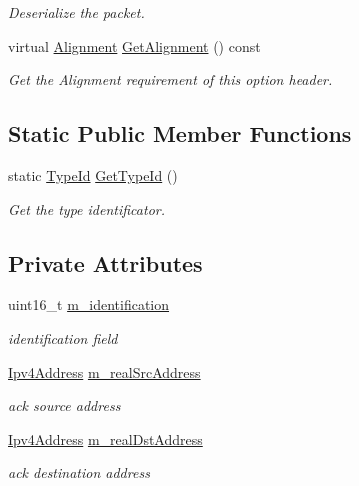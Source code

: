 \begin{DoxyCompactItemize}
\begin{DoxyCompactList}\small\item\em Deserialize the packet. \end{DoxyCompactList}\item 
virtual \hyperlink{structns3_1_1dsr_1_1DsrOptionHeader_1_1Alignment}{Alignment} \hyperlink{classns3_1_1dsr_1_1DsrOptionAckHeader_a300f07b8c1c740581e0d80ffd1f1599d}{Get\+Alignment} () const 
\begin{DoxyCompactList}\small\item\em Get the Alignment requirement of this option header. \end{DoxyCompactList}\end{DoxyCompactItemize}
\subsection*{Static Public Member Functions}
\begin{DoxyCompactItemize}
\item 
static \hyperlink{classns3_1_1TypeId}{Type\+Id} \hyperlink{classns3_1_1dsr_1_1DsrOptionAckHeader_a3ee336c3e3545a02ef5569322907ca18}{Get\+Type\+Id} ()
\begin{DoxyCompactList}\small\item\em Get the type identificator. \end{DoxyCompactList}\end{DoxyCompactItemize}
\subsection*{Private Attributes}
\begin{DoxyCompactItemize}
\item 
uint16\+\_\+t \hyperlink{classns3_1_1dsr_1_1DsrOptionAckHeader_a39abf2407ed4656d1b5f7798bd85f69a}{m\+\_\+identification}
\begin{DoxyCompactList}\small\item\em identification field \end{DoxyCompactList}\item 
\hyperlink{classns3_1_1Ipv4Address}{Ipv4\+Address} \hyperlink{classns3_1_1dsr_1_1DsrOptionAckHeader_ad060f430901fed7d8f971049570baf75}{m\+\_\+real\+Src\+Address}
\begin{DoxyCompactList}\small\item\em ack source address \end{DoxyCompactList}\item 
\hyperlink{classns3_1_1Ipv4Address}{Ipv4\+Address} \hyperlink{classns3_1_1dsr_1_1DsrOptionAckHeader_a624db91e7f17dfaa54d737a801166680}{m\+\_\+real\+Dst\+Address}
\begin{DoxyCompactList}\small\item\em ack destination address \end{DoxyCompactList}\end{DoxyCompactItemize}
